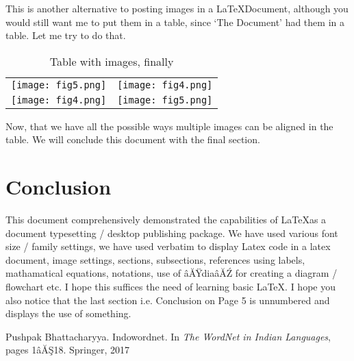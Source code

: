 \documentclass[11pt,a4paper]{article}
\begin{document}
This is another alternative to posting images in a \LaTeX Document, although you would still want me to put them in a table, since ‘The Document’
had them in a table. Let me try to do that.


\begin{table}[htb]
\caption{Table with images, finally}
\begin{tabular}{cc}
     \texttt{[image: fig5.png]}&
     \texttt{[image: fig4.png]}\\
     \texttt{[image: fig4.png]}&
     \texttt{[image: fig5.png]}\\
\end{tabular}
\end{table}

Now, that we have all the possible ways multiple images can be aligned in
the table. We will conclude this document with the final section.

\pagebreak

\section*{Conclusion}
This document comprehensively demonstrated the capabilities of \LaTeX \space as a
document typesetting / desktop publishing package. We have used various
font size / family settings, we have used verbatim to display Latex code
in a latex document, image settings, sections, subsections, references using
labels, mathamatical equations, notations, use of âĂŸdiaâĂŹ for creating
a diagram / flowchart etc.  I hope this suffices the need of learning basic
\LaTeX. I hope you also notice that the last section i.e. Conclusion on Page
5 is unnumbered and displays the use of something.


\begin{thebibliography}{}
Pushpak Bhattacharyya. Indowordnet. In \textit{The WordNet in Indian Languages}, pages 1âĂŞ18. Springer, 2017

\end{thebibliography}
\end{document}
